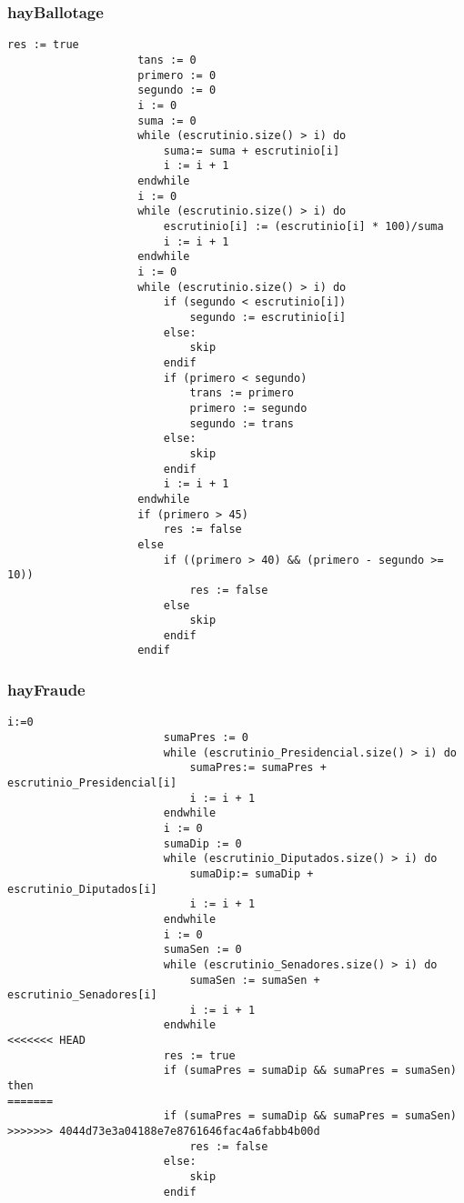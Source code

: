 \documentclass[10pt,a4paper]{article}
\begin{document}
		\subsubsection{hayBallotage}
			\begin{minipage}[t]{\textwidth}
				\begin{lstlisting}[caption={()},label=code:for]
					res := true
					tans := 0
					primero := 0
					segundo := 0
					i := 0
					suma := 0
					while (escrutinio.size() > i) do
						suma:= suma + escrutinio[i]
						i := i + 1
					endwhile
					i := 0
					while (escrutinio.size() > i) do
						escrutinio[i] := (escrutinio[i] * 100)/suma
						i := i + 1
					endwhile
					i := 0
					while (escrutinio.size() > i) do 
						if (segundo < escrutinio[i])
							segundo := escrutinio[i]
						else:
							skip
						endif
						if (primero < segundo)
							trans := primero
							primero := segundo
							segundo := trans
						else:
							skip
						endif
						i := i + 1
					endwhile
					if (primero > 45)
						res := false
					else
						if ((primero > 40) && (primero - segundo >= 10))
							res := false
						else
							skip
						endif
					endif

				\end{lstlisting}
			\end{minipage}

		\subsubsection{hayFraude}
			\begin{minipage}[t]{\textwidth}
				\begin{lstlisting}[caption={()},label=code:for]
						i:=0
						sumaPres := 0
						while (escrutinio_Presidencial.size() > i) do
							sumaPres:= sumaPres + escrutinio_Presidencial[i]
							i := i + 1
						endwhile
						i := 0
						sumaDip := 0
						while (escrutinio_Diputados.size() > i) do
							sumaDip:= sumaDip + escrutinio_Diputados[i]
							i := i + 1
						endwhile
						i := 0
						sumaSen := 0
						while (escrutinio_Senadores.size() > i) do
							sumaSen := sumaSen + escrutinio_Senadores[i]
							i := i + 1
						endwhile
<<<<<<< HEAD
						res := true
						if (sumaPres = sumaDip && sumaPres = sumaSen) then 
=======
						if (sumaPres = sumaDip && sumaPres = sumaSen)
>>>>>>> 4044d73e3a04188e7e8761646fac4a6fabb4b00d
							res := false
						else:
							skip
						endif
				\end{lstlisting}
			\end{minipage}
\end{document}
